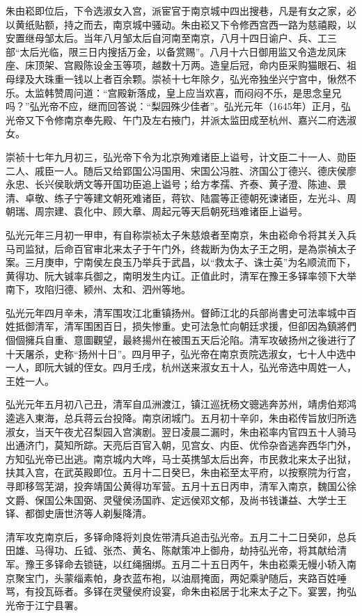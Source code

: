 朱由崧即位后，下令选淑女入宫，派宦官于南京城中四出搜巷，凡是有女之家，必以黄纸贴额，持之而去，南京城中骚动。朱由崧又下令修西宫西一路为慈禧殿，以安置继母邹太后。当年八月邹太后自河南至南京，八月十四日谕户、兵、工三部“太后光临，限三日内搜括万金，以备赏赐”。八月十六日御用监又令造龙凤床座、床顶架、宫殿陈设金玉等项，越数十万两。造皇后冠，命内臣采购猫眼石、祖母绿及大珠重一钱以上者百余颗。崇祯十七年除夕，弘光帝独坐兴宁宫中，愀然不乐。太监韩赞周问道：“宫殿新落成，皇上应当欢喜，而闷闷不乐，是思念皇兄吗？”弘光帝不应，继而回答说：“梨园殊少佳者”。弘光元年（1645年）正月，弘光帝又下令修南京奉先殿、午门及左右掖门，并派太监田成至杭州、嘉兴二府选淑女。

崇祯十七年九月初三，弘光帝下令为北京殉难诸臣上谥号，计文臣二十一人、勋臣二人、戚臣一人。随后又给郢国公冯国用、宋国公冯胜、济国公丁德兴、德庆侯廖永忠、长兴侯耿炳文等开国功臣追上谥号；给方孝孺、齐泰、黄子澄、陈迪、景清、卓敬、练子宁等建文朝死难诸臣，蒋钦、陆震等正德朝死谏诸臣，左光斗、周朝瑞、周宗建、袁化中、顾大章、周起元等天启朝死珰难诸臣上谥号。

弘光元年三月初一甲申，有自称崇祯太子朱慈烺者至南京，朱由崧命令将其关入兵马司监狱，后命百官审北来太子于午门外，终裁断为伪太子王之明，是為崇禎太子案。三月庚申，宁南侯左良玉乃举兵于武昌，以“救太子、诛士英”为名顺流而下，黄得功、阮大铖率兵御之，南明发生内讧。正值此时，清军在豫王多铎率领下大举南下，攻陷归德、颍州、太和、泗州等地。

弘光元年四月辛未，清军围攻江北重镇扬州。督師江北的兵部尚書史可法率城中百姓抵御清军，清军围困百日，损失惨重。史可法急忙向朝廷求援，但卻因為鎮將們個個擁兵自重、意圖觀望，最終揚州在被围五天后沦陷。清军攻破扬州之後进行了十天屠杀，史称“扬州十日”。四月甲子，弘光帝在南京贡院选淑女，七十人中选中一人，即阮大铖的侄女。四月壬戌，杭州送来淑女五十人，弘光帝选中周姓一人，王姓一人。

弘光元年五月初八己丑，清军自瓜洲渡江，镇江巡抚杨文骢逃奔苏州，靖虏伯郑鸿逵逃入東海，总兵蒋云台投降。南京闭城门。五月初十辛卯，朱由崧传旨放归所选淑女，当天午夜尤召梨园入宫演剧。翌日凌晨二漏时，朱由崧率内官四五十人骑马出通济门，莫知所踪。天亮后百官入朝，见宫女、内臣、优伶杂沓逃奔西华门外，方知弘光帝已出逃。南京城内大哗，马士英携邹太后出奔，市民救北来太子出狱，扶其入宫，在武英殿即位。五月十二日癸巳，朱由崧至太平府，以按察院为行宫，寻即移驾芜湖，投奔靖国公黄得功军营。五月十五日丙申，清军入南京，魏国公徐文爵、保国公朱国弼、灵璧侯汤国祚、定远侯邓文郁，及尚书钱谦益、大学士王铎、都御史唐世济等人剃髮降清。

清军攻克南京后，多铎命降将刘良佐带清兵追击弘光帝。五月二十二日癸卯，总兵田雄、马得功、丘钺、张杰、黄名、陈献策冲上御舟，劫持弘光帝，将其献给清军。豫王多铎命去锁链，以红绳捆绑。五月二十五日丙午，朱由崧乘无幔小轿入南京聚宝门，头蒙缁素帕，身衣蓝布袍，以油扇掩面，两妃乘驴随后，夹路百姓唾骂，有投瓦砾者。多铎在灵璧侯府设宴，命朱由崧居于北来太子之下。宴罢，拘弘光帝于江宁县署。

